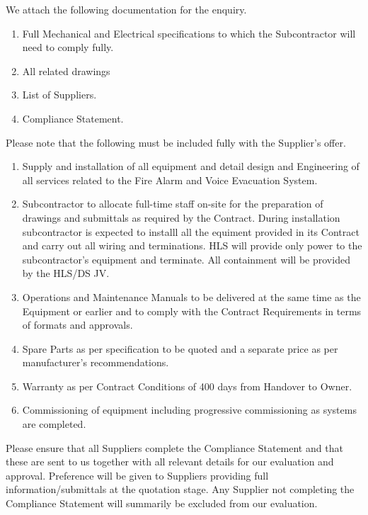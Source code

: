 \documentclass[a4paper,12pt,oneside]{article}
\begin{document}
\begin{mcdletter}

We attach the following documentation for the enquiry.

\begin{enumerate}    
\item Full Mechanical and Electrical specifications to which the Subcontractor will need to comply fully.
\item All related drawings
\item List of Suppliers.
\item Compliance Statement.
\end{enumerate}

Please note that the following must be included fully with the Supplier's offer.

\begin{enumerate}
\item Supply and installation of all equipment and detail design and Engineering of all services related to the Fire Alarm and Voice Evacuation System.

\item Subcontractor to allocate full-time staff on-site for the preparation of drawings and submittals as required by the Contract. During installation subcontractor is expected to installl all the equiment provided in its Contract and carry out all wiring and terminations. HLS will provide only power to the subcontractor's equipment and terminate.  All containment will be provided by the HLS/DS JV.

\item Operations and Maintenance Manuals to be delivered at the same time as the Equipment or earlier and to comply with the Contract Requirements in terms of formats and approvals.

\item Spare Parts as per specification to be quoted and a separate price as per manufacturer's recommendations.

\item Warranty as per Contract Conditions of 400 days from Handover to Owner.

\item Commissioning of equipment including progressive commissioning as systems are completed.
\end{enumerate}

Please ensure that all Suppliers complete the Compliance Statement and that these are sent to us together with all relevant details for our evaluation and approval. Preference will be given to Suppliers providing full information/submittals at the quotation stage. Any Supplier not completing the Compliance Statement will summarily be excluded from our evaluation.
\end{mcdletter}
\end{document}

